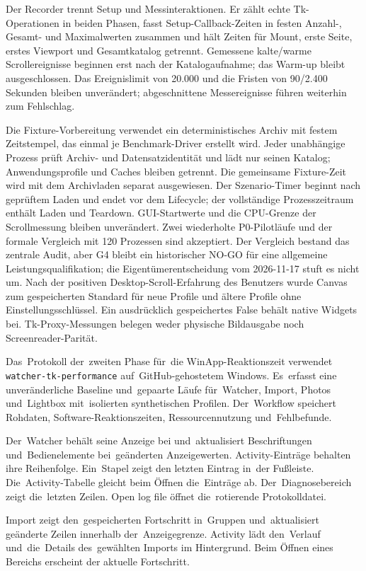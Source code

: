 \documentclass[11pt,a4paper]{article}
\newcommand{\codeword}[1]{\nolinkurl{#1}}
\begin{document}
Der Recorder trennt Setup und Messinteraktionen. Er zählt echte Tk-Operationen
in beiden Phasen, fasst Setup-Callback-Zeiten in festen Anzahl-, Gesamt- und
Maximalwerten zusammen und hält Zeiten für Mount, erste Seite, erstes
Viewport und Gesamtkatalog getrennt. Gemessene kalte/warme Scrollereignisse
beginnen erst nach der Katalogaufnahme; das Warm-up bleibt ausgeschlossen.
Das Ereignislimit von 20.000 und die Fristen von 90/2.400 Sekunden bleiben
unverändert; abgeschnittene Messereignisse führen weiterhin zum Fehlschlag.

Die Fixture-Vorbereitung verwendet ein deterministisches Archiv mit festem
Zeitstempel, das einmal je Benchmark-Driver erstellt wird. Jeder unabhängige
Prozess prüft Archiv- und Datensatzidentität und lädt nur seinen Katalog;
Anwendungsprofile und Caches bleiben getrennt. Die gemeinsame Fixture-Zeit wird
mit dem Archivladen separat ausgewiesen. Der Szenario-Timer beginnt nach
geprüftem Laden und endet vor dem Lifecycle; der vollständige Prozesszeitraum
enthält Laden und Teardown. GUI-Startwerte und die CPU-Grenze der Scrollmessung bleiben
unverändert. Zwei wiederholte P0-Pilotläufe und der formale Vergleich mit 120 Prozessen
sind akzeptiert. Der Vergleich bestand das zentrale Audit, aber G4 bleibt ein
historischer NO-GO für eine allgemeine Leistungsqualifikation; die
Eigentümerentscheidung vom 2026-11-17 stuft es nicht um. Nach der positiven
Desktop-Scroll-Erfahrung des Benutzers wurde Canvas zum gespeicherten Standard
für neue Profile und ältere Profile ohne Einstellungsschlüssel. Ein
ausdrücklich gespeichertes False behält native Widgets bei. Tk-Proxy-Messungen
belegen weder physische Bildausgabe noch Screenreader-Parität.

Das~Protokoll der~zweiten Phase für~die WinApp-Reaktionszeit verwendet
\codeword{watcher-tk-performance} auf~GitHub-gehostetem Windows. Es~erfasst
eine unveränderliche Baseline und~gepaarte Läufe für~Watcher, Import, Photos
und~Lightbox mit~isolierten synthetischen Profilen. Der~Workflow speichert
Rohdaten, Software-Reaktionszeiten, Ressourcennutzung und~Fehlbefunde.

Der~Watcher behält seine Anzeige bei und~aktualisiert Beschriftungen
und~Bedienelemente bei~geänderten Anzeigewerten. Activity-Einträge
behalten ihre Reihenfolge. Ein~Stapel zeigt den letzten Eintrag in~der
Fußleiste. Die~Activity-Tabelle gleicht beim Öffnen die~Einträge ab.
Der~Diagnosebereich zeigt die~letzten Zeilen. Open log file öffnet
die~rotierende Protokolldatei.

Import zeigt den~gespeicherten Fortschritt in~Gruppen und~aktualisiert
geänderte Zeilen innerhalb der~Anzeigegrenze. Activity lädt den~Verlauf
und~die~Details des~gewählten Imports im Hintergrund. Beim Öffnen eines
Bereichs erscheint der aktuelle Fortschritt.
\end{document}
